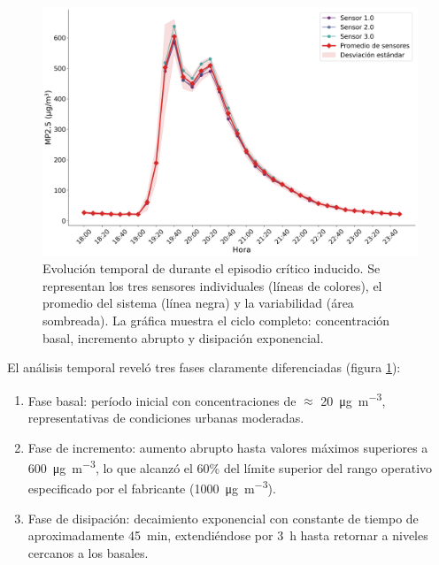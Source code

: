 \begin{figure}
	\centering
	\includegraphics[width=1\linewidth]{Figures/grafico_episodio_critico_pm25}
 \caption{Evolución temporal de \MPF durante el episodio crítico inducido. Se representan los tres sensores individuales (líneas de colores), el promedio del sistema (línea negra) y la variabilidad (área sombreada). La gráfica muestra el ciclo completo: concentración basal, incremento abrupto y disipación exponencial.}
	\label{fig:graficoepisodiocriticopm25}
\end{figure}

El análisis temporal reveló tres fases claramente diferenciadas (figura \ref{fig:graficoepisodiocriticopm25}):

\begin{enumerate}
\item Fase basal: período inicial con concentraciones de  $\approx$ \SI{20}{\micro\gram\per\cubic\meter}, representativas de condiciones urbanas moderadas.

	
	\item Fase de incremento: aumento abrupto hasta valores máximos superiores a \SI{600}{\micro\gram\per\cubic\meter}, lo que alcanzó el 60\% del límite superior del rango operativo especificado por el fabricante (\SI{1000}{\micro\gram\per\cubic\meter}).
	
	\item Fase de disipación: decaimiento exponencial con constante de tiempo de aproximadamente \SI{45}{\minute}, extendiéndose por \SI{3}{\hour} hasta retornar a niveles cercanos a los basales.
\end{enumerate}


